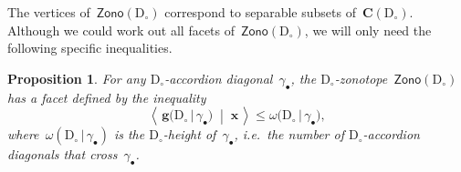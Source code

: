 \documentclass{amsart}
\newtheorem{proposition}[theorem]{Proposition}
\theoremstyle{definition}
\renewcommand{\b}[1]{\mathbf{#1}} %
\newcommand{\dotprod}[2]{\left\langle \, #1 \; \middle| \; #2 \, \right\rangle} %
\newcommand{\Zono}{\mathsf{Zono}} %
\newcommand{\ie}{\textit{i.e.}~} %
\newcommand{\darkblue}{\color{darkblue}} %
\newcommand{\defn}[1]{\textsl{\darkblue #1}} %
\newcommand{\dissection}{\mathrm{D}} %
\newcommand{\biggvector}[2]{\mathbf{g} \big( #1 \,|\, #2 \big)} %
\newcommand{\allcvectors}[1]{\mathbf{C}(#1)} %
\newcommand{\rhs}[2]{\omega(#1 \,|\, #2)} %
\newcommand{\bigrhs}[2]{\omega \big( #1  \,|\, #2 \big)} %
\begin{document}
The vertices of~$\Zono(\dissection_\circ)$ correspond to separable subsets of~$\allcvectors{\dissection_\circ}$. Although we could work out all facets of~$\Zono(\dissection_\circ)$, we will only need the following specific inequalities.

\begin{proposition}
\label{prop:inequalitiesZonotope}
For any $\dissection_\circ$-accordion diagonal~$\gamma_\bullet$, the $\dissection_\circ$-zonotope~$\Zono(\dissection_\circ)$ has a facet defined by the inequality
\[
\dotprod{\biggvector{\dissection_\circ}{\gamma_\bullet}}{\b{x}} \le \bigrhs{\dissection_\circ}{\gamma_\bullet},
\]
where~$\rhs{\dissection_\circ}{\gamma_\bullet}$ is the \defn{$\dissection_\circ$-height} of~$\gamma_\bullet$, \ie the number of $\dissection_\circ$-accordion diagonals that cross~$\gamma_\bullet$.
\end{proposition}
\end{document}
